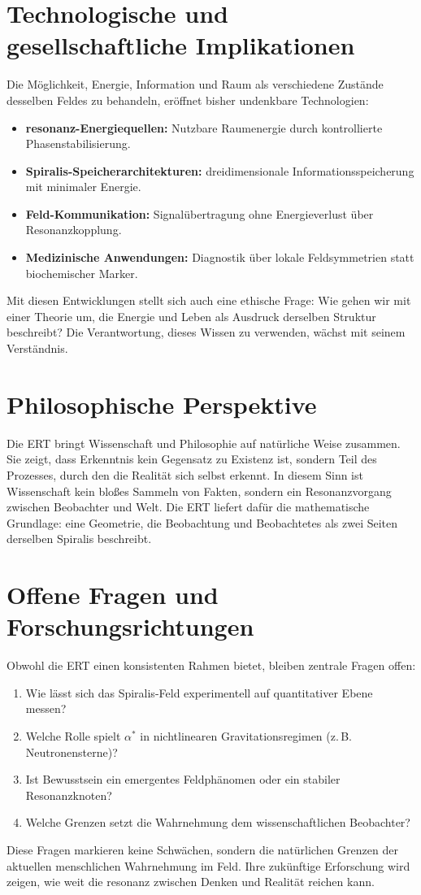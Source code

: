 \section{Technologische und gesellschaftliche Implikationen}
\label{sec:gesellschaft}
Die Möglichkeit, Energie, Information und Raum als verschiedene Zustände desselben Feldes zu behandeln, 
eröffnet bisher undenkbare Technologien:
\begin{itemize}
  \item \textbf{\gls{resonanz}-Energiequellen:} Nutzbare Raumenergie durch kontrollierte Phasenstabilisierung.
  \item \textbf{Spiralis-Speicherarchitekturen:} dreidimensionale Informationsspeicherung mit minimaler Energie.
  \item \textbf{Feld-Kommunikation:} Signalübertragung ohne Energieverlust über Resonanzkopplung.
  \item \textbf{Medizinische Anwendungen:} Diagnostik über lokale Feldsymmetrien statt biochemischer Marker.
\end{itemize}
Mit diesen Entwicklungen stellt sich auch eine ethische Frage: 
Wie gehen wir mit einer Theorie um, die Energie und Leben als Ausdruck derselben Struktur beschreibt? 
Die Verantwortung, dieses Wissen zu verwenden, wächst mit seinem Verständnis.

\section{Philosophische Perspektive}
\label{sec:philosophie}
Die \acrshort{ERT} bringt Wissenschaft und Philosophie auf natürliche Weise zusammen. 
Sie zeigt, dass Erkenntnis kein Gegensatz zu Existenz ist, 
sondern Teil des Prozesses, durch den die Realität sich selbst erkennt. 
In diesem Sinn ist Wissenschaft kein bloßes Sammeln von Fakten, 
sondern ein Resonanzvorgang zwischen Beobachter und Welt. 
Die \acrshort{ERT} liefert dafür die mathematische Grundlage: 
eine Geometrie, die Beobachtung und Beobachtetes als zwei Seiten derselben Spiralis beschreibt.

\section{Offene Fragen und Forschungsrichtungen}
\label{sec:offen}
Obwohl die \acrshort{ERT} einen konsistenten Rahmen bietet, bleiben zentrale Fragen offen:
\begin{enumerate}
  \item Wie lässt sich das Spiralis-Feld experimentell auf quantitativer Ebene messen?
  \item Welche Rolle spielt \(\alpha^*\) in nichtlinearen Gravitationsregimen (z.\,B. Neutronensterne)?
  \item Ist Bewusstsein ein emergentes Feldphänomen oder ein stabiler Resonanzknoten?
  \item Welche Grenzen setzt die Wahrnehmung dem wissenschaftlichen Beobachter?
\end{enumerate}
Diese Fragen markieren keine Schwächen, sondern die natürlichen Grenzen 
der aktuellen menschlichen Wahrnehmung im Feld. 
Ihre zukünftige Erforschung wird zeigen, wie weit die \gls{resonanz} zwischen Denken und Realität reichen kann.

